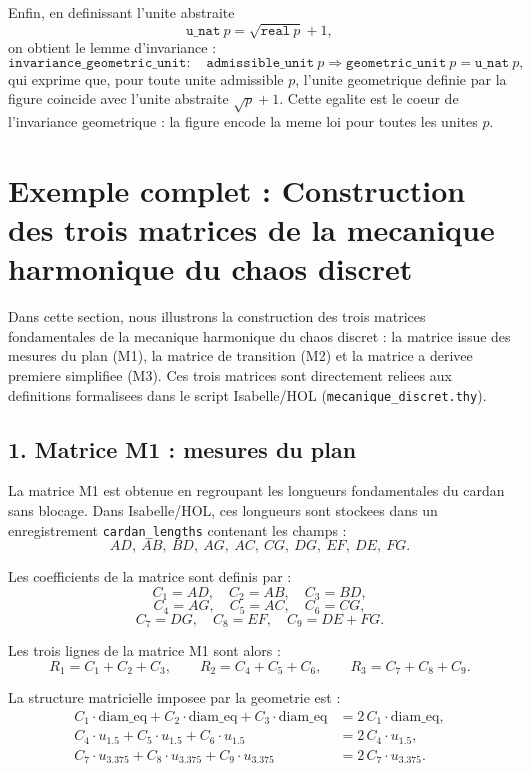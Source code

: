 \documentclass[12pt,a4paper]{article}
\theoremstyle{definition}
\theoremstyle{remark}
\begin{document}
Enfin, en definissant l'unite abstraite
\[
  \texttt{u\_nat}\ p = \sqrt{\texttt{real}\ p} + 1,
\]
on obtient le lemme d'invariance :
\[
  \texttt{invariance\_geometric\_unit} :
  \quad \texttt{admissible\_unit}\ p
  \Longrightarrow
  \texttt{geometric\_unit}\ p = \texttt{u\_nat}\ p,
\]
qui exprime que, pour toute unite admissible $p$, l'unite geometrique
definie par la figure coincide avec l'unite abstraite $\sqrt{p} + 1$.
Cette egalite est le coeur de l'invariance geometrique : la figure encode
la meme loi pour toutes les unites $p$.

\section{Exemple complet : Construction des trois matrices de la mecanique harmonique du chaos discret}

Dans cette section, nous illustrons la construction des trois matrices fondamentales
de la mecanique harmonique du chaos discret : la matrice issue des mesures du plan
(M1), la matrice de transition (M2) et la matrice a derivee premiere simplifiee (M3).
Ces trois matrices sont directement reliees aux definitions formalisees dans le
script Isabelle/HOL (\texttt{mecanique\_discret.thy}).

\subsection{1. Matrice M1 : mesures du plan}

La matrice M1 est obtenue en regroupant les longueurs fondamentales du cardan
sans blocage. Dans Isabelle/HOL, ces longueurs sont stockees dans un enregistrement
\texttt{cardan\_lengths} contenant les champs :
\[
  AD,\ AB,\ BD,\ AG,\ AC,\ CG,\ DG,\ EF,\ DE,\ FG.
\]

Les coefficients de la matrice sont definis par :
\[
  C_1 = AD,\quad C_2 = AB,\quad C_3 = BD,
\]
\[
  C_4 = AG,\quad C_5 = AC,\quad C_6 = CG,
\]
\[
  C_7 = DG,\quad C_8 = EF,\quad C_9 = DE + FG.
\]

Les trois lignes de la matrice M1 sont alors :
\[
  R_1 = C_1 + C_2 + C_3,\qquad
  R_2 = C_4 + C_5 + C_6,\qquad
  R_3 = C_7 + C_8 + C_9.
\]

La structure matricielle imposee par la geometrie est :
\[
  \begin{aligned}
    C_1 \cdot \mathrm{diam\_eq} + C_2 \cdot \mathrm{diam\_eq} + C_3 \cdot \mathrm{diam\_eq}
      &= 2\, C_1 \cdot \mathrm{diam\_eq}, \\
    C_4 \cdot u_{1.5} + C_5 \cdot u_{1.5} + C_6 \cdot u_{1.5}
      &= 2\, C_4 \cdot u_{1.5}, \\
    C_7 \cdot u_{3.375} + C_8 \cdot u_{3.375} + C_9 \cdot u_{3.375}
      &= 2\, C_7 \cdot u_{3.375}.
  \end{aligned}
\]
\end{document}
